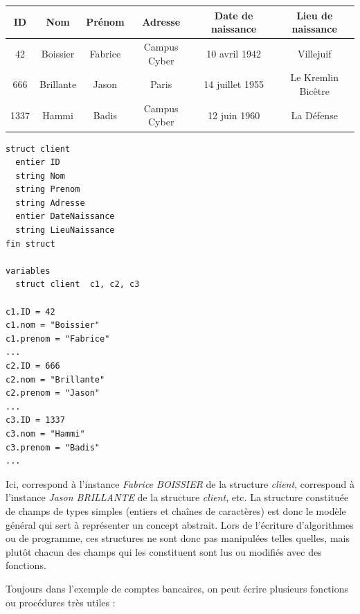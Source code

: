 \documentclass[11pt,a4paper]{article}
\begin{document}
\begin{center}

\begin{tabular}{| c | c | c | c | c | c |}
\hline
ID & Nom & Prénom & Adresse & Date de naissance & Lieu de naissance \\
\hline
42  & Boissier & Fabrice & Campus Cyber & 10 avril 1942 & Villejuif \\
666 & Brillante & Jason & Paris & 14 juillet 1955 & Le Kremlin Bicêtre \\
1337 & Hammi & Badis & Campus Cyber & 12 juin 1960 & La Défense \\
\hline
\end{tabular}

\bigskip

\begin{lstlisting}[style=algorithmique]
struct client
  entier ID
  string Nom
  string Prenom
  string Adresse
  entier DateNaissance
  string LieuNaissance
fin struct

variables
  struct client  c1, c2, c3

c1.ID = 42
c1.nom = "Boissier"
c1.prenom = "Fabrice"
...
c2.ID = 666
c2.nom = "Brillante"
c2.prenom = "Jason"
...
c3.ID = 1337
c3.nom = "Hammi"
c3.prenom = "Badis"
... \end{lstlisting}

\end{center}


Ici,  correspond à l'instance \textit{Fabrice BOISSIER} de la structure \textit{client},  correspond à l'instance \textit{Jason BRILLANTE} de la structure \textit{client}, etc.
La structure constituée de champs de types simples (entiers et chaînes de caractères) est donc le modèle général qui sert à représenter un concept abstrait.
Lors de l'écriture d'algorithmes ou de programme, ces structures ne sont donc pas manipulées telles quelles, mais plutôt chacun des champs qui les constituent sont lus ou modifiés avec des fonctions.

\medskip

Toujours dans l'exemple de comptes bancaires, on peut écrire plusieurs fonctions ou procédures très utiles :
\end{document}
